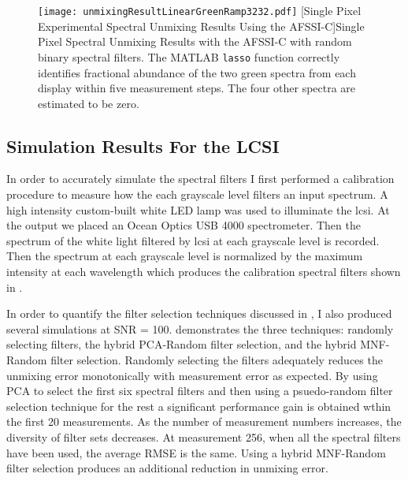\begin{figure}[H]
	\centering
	\texttt{[image: unmixingResultLinearGreenRamp3232.pdf]}
	[Single Pixel Experimental Spectral Unmixing Results Using the AFSSI-C]{Single Pixel Spectral Unmixing Results with the AFSSI-C with random binary spectral filters. The MATLAB \texttt{lasso} function correctly identifies fractional abundance of the two green spectra from each display within five measurement steps. The four other spectra are estimated to be zero. }
	\label{fig:unmixingResultLinearGreenRamp3232} 
\end{figure}


\subsection{Simulation Results For the LCSI}

In order to accurately simulate the spectral filters I first performed a calibration procedure to measure how the each grayscale level filters an input spectrum. A high intensity custom-built white LED lamp was used to illuminate the \gls{lcsi}. At the output we placed an Ocean Optics USB 4000 spectrometer. Then the spectrum of the white light filtered by \gls{lcsi} at each grayscale level is recorded. Then the spectrum at each grayscale level is normalized by the maximum intensity at each wavelength which produces the calibration spectral filters shown in .

 In order to quantify the filter selection techniques discussed in , I also produced several simulations at SNR = 100.  demonstrates the three techniques: randomly selecting filters, the hybrid PCA-Random filter selection, and the hybrid MNF-Random filter selection. Randomly selecting the filters adequately reduces the unmixing error monotonically with measurement error as expected. By using PCA to select the first six spectral filters and then using a psuedo-random filter selection technique for the rest a significant performance gain is obtained wthin the first 20 measurements. As the number of measurement numbers increases, the diversity of filter sets decreases. At measurement 256, when all the spectral filters have been used, the average RMSE is the same. Using a hybrid MNF-Random filter selection produces an additional reduction in unmixing error.



